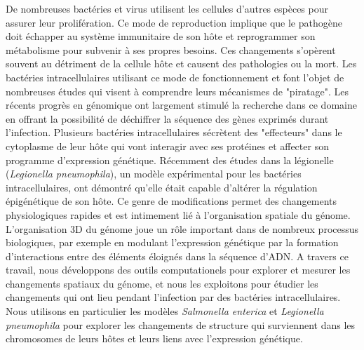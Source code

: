 De nombreuses bactéries et virus utilisent les cellules d'autres espèces pour assurer leur prolifération. Ce mode de reproduction implique que le pathogène doit échapper au système immunitaire de son hôte et reprogrammer son métabolisme pour subvenir à ses propres besoins. Ces changements s'opèrent souvent au détriment de la cellule hôte et causent des pathologies ou la mort. Les bactéries intracellulaires utilisant ce mode de fonctionnement et font l'objet de nombreuses études qui visent à comprendre leurs mécanismes de "piratage". Les récents progrès en génomique ont largement stimulé la recherche dans ce domaine en offrant la possibilité de déchiffrer la séquence des gènes exprimés durant l'infection. Plusieurs bactéries intracellulaires sécrètent des "effecteurs" dans le cytoplasme de leur hôte qui vont interagir avec ses protéines et affecter son programme d'expression génétique. Récemment des études dans la légionelle (\textit{Legionella pneumophila}), un modèle expérimental pour les bactéries intracellulaires, ont démontré qu'elle était capable d'altérer la régulation épigénétique de son hôte. Ce genre de modifications permet des changements physiologiques rapides et est intimement lié à l'organisation spatiale du génome. L'organisation 3D du génome joue un rôle important dans de nombreux processus biologiques, par exemple en modulant l'expression génétique par la formation d'interactions entre des éléments éloignés dans la séquence d'ADN. A travers ce travail, nous développons des outils computationels pour explorer et mesurer les changements spatiaux du génome, et nous les exploitons pour étudier les changements qui ont lieu pendant l'infection par des bactéries intracellulaires. Nous utilisons en particulier les modèles \textit{Salmonella enterica } et \textit{Legionella pneumophila} pour explorer les changements de structure qui surviennent dans les chromosomes de leurs hôtes et leurs liens avec l'expression génétique.

